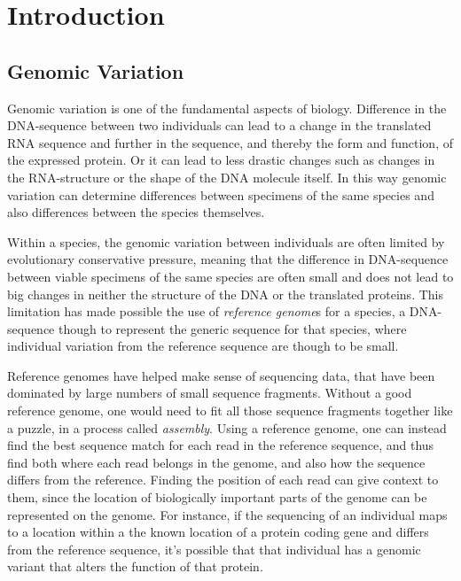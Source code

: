 \chapter{Introduction}
\section{Genomic Variation}
Genomic variation is one of the fundamental aspects of biology.
Difference in the DNA-sequence between two individuals can lead to a change in the translated RNA sequence and further in the sequence, and thereby the form and function, of the expressed protein.
Or it can lead to less drastic changes such as changes in the RNA-structure or the shape of the DNA molecule itself.
In this way genomic variation can determine differences between specimens of the same species and also differences between the species themselves.

Within a species, the genomic variation between individuals are often limited by evolutionary conservative pressure, 
meaning that the difference in DNA-sequence between viable specimens of the same species are often small and does not lead to big changes in neither the structure of the DNA or the translated proteins.
This limitation has made  possible the use of \emph{reference genome}s for a species, a DNA-sequence though to represent the generic sequence for that species, where individual variation from the reference sequence are though to be small.

Reference genomes have helped make sense of sequencing data, that have been dominated by large numbers of small sequence fragments.
Without a good reference genome, one would need to fit all those sequence fragments together like a puzzle, in a process called \emph{assembly}.
Using a reference genome, one can instead find the best sequence match for each read in the reference sequence, and thus find both where each read belongs in the genome, and also how the sequence differs from the reference.
Finding the position of each read can give context to them, since the location of biologically important parts of the genome can be represented on the genome.
For instance, if the sequencing of an individual maps to a location within a the known location of a protein coding gene and differs from the reference sequence, it's possible that that individual has a genomic variant that alters the function of that protein. 

